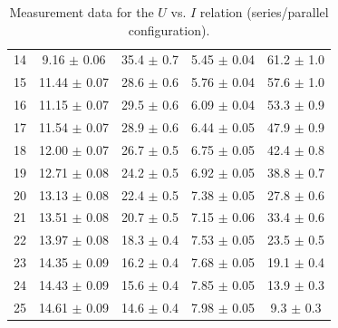\documentclass[a4paper]{article}
\begin{document}
\begin{table}[H]
\begin{tabular}{ccc||cc}
		14 & 9.16  $\pm$ 0.06             & 35.4   $\pm$ 0.7             & 5.45   $\pm$ 0.04            & 61.2 $\pm$ 1.0               \\
		15 & 11.44 $\pm$ 0.07             & 28.6   $\pm$ 0.6             & 5.76   $\pm$ 0.04            & 57.6 $\pm$ 1.0               \\
		16 & 11.15 $\pm$ 0.07             & 29.5   $\pm$ 0.6             & 6.09   $\pm$ 0.04            & 53.3 $\pm$ 0.9               \\
		17 & 11.54 $\pm$ 0.07             & 28.9   $\pm$ 0.6             & 6.44   $\pm$ 0.05            & 47.9 $\pm$ 0.9               \\
		18 & 12.00 $\pm$ 0.07             & 26.7   $\pm$ 0.5             & 6.75   $\pm$ 0.05            & 42.4 $\pm$ 0.8               \\
		19 & 12.71 $\pm$ 0.08             & 24.2   $\pm$ 0.5             & 6.92   $\pm$ 0.05            & 38.8 $\pm$ 0.7               \\
		20 & 13.13 $\pm$ 0.08             & 22.4   $\pm$ 0.5             & 7.38   $\pm$ 0.05            & 27.8 $\pm$ 0.6               \\
		21 & 13.51 $\pm$ 0.08             & 20.7   $\pm$ 0.5             & 7.15   $\pm$ 0.06            & 33.4 $\pm$ 0.6               \\
		22 & 13.97 $\pm$ 0.08             & 18.3   $\pm$ 0.4             & 7.53   $\pm$ 0.05            & 23.5 $\pm$ 0.5               \\
		23 & 14.35 $\pm$ 0.09             & 16.2   $\pm$ 0.4             & 7.68   $\pm$ 0.05            & 19.1 $\pm$ 0.4               \\
		24 & 14.43 $\pm$ 0.09             & 15.6   $\pm$ 0.4             & 7.85   $\pm$ 0.05            & 13.9 $\pm$ 0.3               \\
		25 & 14.61 $\pm$ 0.09             & 14.6   $\pm$ 0.4             & 7.98   $\pm$ 0.05            & 9.3  $\pm$ 0.3               \\
		\hline
	\end{tabular}
	\caption{Measurement data for the $U$ vs. $I$ relation (series/parallel configuration).}
	\label{table::126.0}
\end{table}
\end{document}
